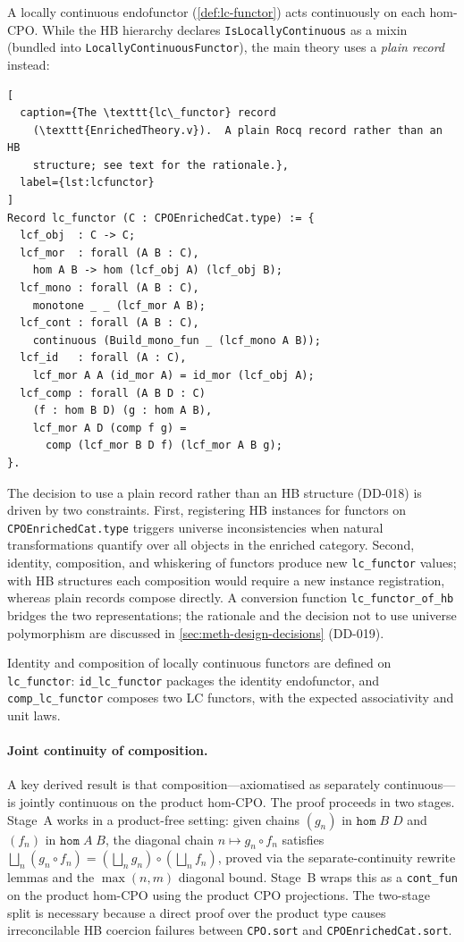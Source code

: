 
A locally continuous endofunctor (\cref{def:lc-functor}) acts
continuously on each hom-CPO.  While the HB hierarchy declares
\texttt{IsLocallyContinuous} as a mixin (bundled into
\texttt{LocallyContinuousFunctor}), the main theory uses a
\emph{plain record} instead:

\begin{lstlisting}[
  caption={The \texttt{lc\_functor} record
    (\texttt{EnrichedTheory.v}).  A plain Rocq record rather than an HB
    structure; see text for the rationale.},
  label={lst:lcfunctor}
]
Record lc_functor (C : CPOEnrichedCat.type) := {
  lcf_obj  : C -> C;
  lcf_mor  : forall (A B : C),
    hom A B -> hom (lcf_obj A) (lcf_obj B);
  lcf_mono : forall (A B : C),
    monotone _ _ (lcf_mor A B);
  lcf_cont : forall (A B : C),
    continuous (Build_mono_fun _ (lcf_mono A B));
  lcf_id   : forall (A : C),
    lcf_mor A A (id_mor A) = id_mor (lcf_obj A);
  lcf_comp : forall (A B D : C)
    (f : hom B D) (g : hom A B),
    lcf_mor A D (comp f g) =
      comp (lcf_mor B D f) (lcf_mor A B g);
}.
\end{lstlisting}

The decision to use a plain record rather than an HB structure (DD-018)
is driven by two constraints.  First, registering HB instances for
functors on \texttt{CPOEnrichedCat.type} triggers universe
inconsistencies when natural transformations quantify over all objects
in the enriched category.  Second, identity, composition, and
whiskering of functors produce new \texttt{lc\_functor} values; with HB
structures each composition would require a new instance registration,
whereas plain records compose directly.  A conversion function
\texttt{lc\_functor\_of\_hb} bridges the two representations;
the rationale and the decision not to use universe polymorphism are
discussed in \cref{sec:meth-design-decisions} (DD-019).

Identity and composition of locally continuous functors are defined on
\texttt{lc\_functor}: \texttt{id\_lc\_functor} packages the identity
endofunctor, and \texttt{comp\_lc\_functor} composes two LC functors,
with the expected associativity and unit laws.

\paragraph{Joint continuity of composition.}
A key derived result is that composition---axiomatised as separately
continuous---is jointly continuous on the product hom-CPO.  The proof
proceeds in two stages.  Stage~A works in a product-free setting: given
chains $(g_n)$ in $\texttt{hom}\;B\;D$ and $(f_n)$ in
$\texttt{hom}\;A\;B$, the diagonal chain $n \mapsto g_n \circ f_n$
satisfies $\bigsqcup_n (g_n \circ f_n) = (\bigsqcup_n g_n)
\circ (\bigsqcup_n f_n)$, proved via the separate-continuity rewrite
lemmas and the $\max(n,m)$ diagonal bound.  Stage~B wraps this as a
\texttt{cont\_fun} on the product hom-CPO using the product CPO
projections.  The two-stage split is necessary because a direct proof
over the product type causes irreconcilable HB coercion failures
between \texttt{CPO.sort} and \texttt{CPOEnrichedCat.sort}.

